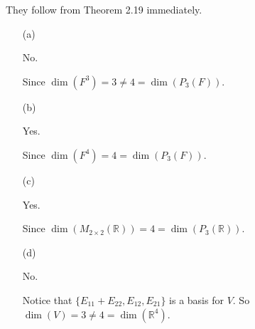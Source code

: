 \begin{Exercise}
They follow from Theorem 2.19 immediately.
\begin{enumerate}[(a)]
\item[(a)]
\begin{answer}
No.
\end{answer}
\begin{solution}
Since $\dim(F^3) = 3 \neq 4 = \dim(P_3(F))$.
\end{solution}

\item[(b)]
\begin{answer}
Yes.
\end{answer}
\begin{solution}
Since $\dim(F^4) = 4 = \dim(P_3(F))$.
\end{solution}

\item[(c)]
\begin{answer}
Yes.
\end{answer}
\begin{solution}
Since $\dim(M_{2\times 2}(\mathbb{R})) = 4 = \dim(P_3(\mathbb{R}))$.
\end{solution}

\item[(d)]
\begin{answer}
No.
\end{answer}
\begin{solution}
Notice that $\{E_{1 1}+E_{2 2}, E_{1 2}, E_{2 1}\}$ is a basis for $V$. So $\dim(V) = 3 \neq 4 = \dim(\mathbb{R}^4)$.
\end{solution}

\end{enumerate}
\end{Exercise}